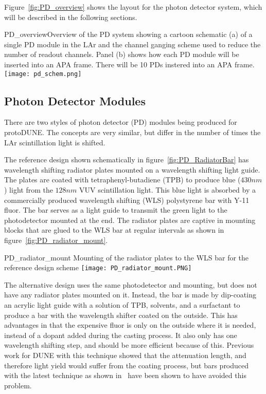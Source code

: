 Figure~\ref{fig:PD_overview} shows the layout for the photon detector
system, which will be described in the following sections.
\begin{cdrfigure}{PD_overview}{Overview of the PD
    system showing a cartoon schematic (a) of a single PD module
    in the LAr and the channel ganging scheme used to reduce the
    number of readout channels. Panel (b) shows how each PD module
    will be inserted into an APA frame. There will be 10 PDs instered
    into an APA frame.}
\texttt{[image: pd\_schem.png]}
\end{cdrfigure}

\subsection{Photon Detector Modules}

There are two styles of photon detector (PD) modules being produced for protoDUNE.  
The concepts are very similar, but differ in the number of times the LAr scintillation 
light is shifted.  

The reference design shown schematically in figure~\ref{fig:PD_RadiatorBar}
has wavelength shifting radiator plates mounted on a wavelength shifting light guide.
The plates are coated 
with tetraphenyl-butadiene (TPB) to produce blue ($430nm$) light from the $128nm$ VUV 
scintillation light.  
This blue light is absorbed by a commercially produced wavelength shifting (WLS)
polystyrene bar with Y-11 fluor.  
The bar serves as a light guide to transmit the green light to the photodetector 
mounted at the end.
The radiator plates are captive in mounting blocks that are glued to the WLS bar
at regular intervals as shown in figure~\ref{fig:PD_radiator_mount}.
\begin{cdrfigure}{PD_radiator_mount}
  {Mounting of the radiator plates to the WLS bar for the reference design scheme}
\texttt{[image: PD\_radiator\_mount.PNG]}
\end{cdrfigure}

The alternative design uses the same photodetector and mounting, but does not have
any radiator plates mounted on it.  
Instead, the bar is made by dip-coating an acrylic light guide with a solution
of TPB, solvents, and a surfactant to produce a bar with the wavelength shifter coated
on the outside.  
This has advantages in that the expensive fluor is only on the outside where it is
needed, instead of a dopant added during the casting process.  
It also only has one wavelength shifting step, and should be more efficient because
of this.  
Previous work for DUNE with this technique showed that the attenuation length, and
therefore light yield would suffer from the coating process, but bars produced with
the latest technique as shown in~\cite{conrad_jinst} have been shown to have avoided
this problem.

